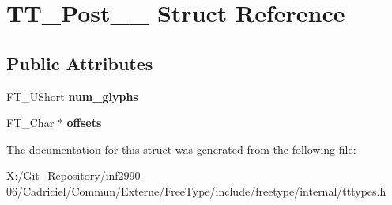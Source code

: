 \hypertarget{struct_t_t___post__25__}{\section{T\-T\-\_\-\-Post\-\_\-\_\- Struct Reference}
\label{struct_t_t___post__25__}
}
\subsection*{Public Attributes}
\begin{DoxyCompactItemize}
\item 
\hypertarget{struct_t_t___post__25___aae397ce6206c910ecc13f8b46bace595}{F\-T\-\_\-\-U\-Short {\bfseries num\-\_\-glyphs}}\label{struct_t_t___post__25___aae397ce6206c910ecc13f8b46bace595}

\item 
\hypertarget{struct_t_t___post__25___a499ec966b258c8454e9ea8f9455028b6}{F\-T\-\_\-\-Char $\ast$ {\bfseries offsets}}\label{struct_t_t___post__25___a499ec966b258c8454e9ea8f9455028b6}

\end{DoxyCompactItemize}


The documentation for this struct was generated from the following file\-:\begin{DoxyCompactItemize}
\item 
X\-:/\-Git\-\_\-\-Repository/inf2990-\/06/\-Cadriciel/\-Commun/\-Externe/\-Free\-Type/include/freetype/internal/tttypes.\-h\end{DoxyCompactItemize}
